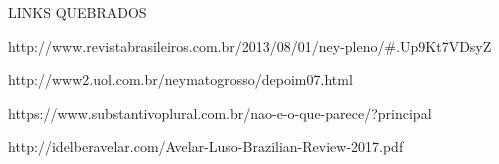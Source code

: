 LINKS QUEBRADOS

http://www.revistabrasileiros.com.br/2013/08/01/ney-pleno/#.Up9Kt7VDsyZ

http://www2.uol.com.br/neymatogrosso/depoim07.html

https://www.substantivoplural.com.br/nao-e-o-que-parece/?principal

http://idelberavelar.com/Avelar-Luso-Brazilian-Review-2017.pdf